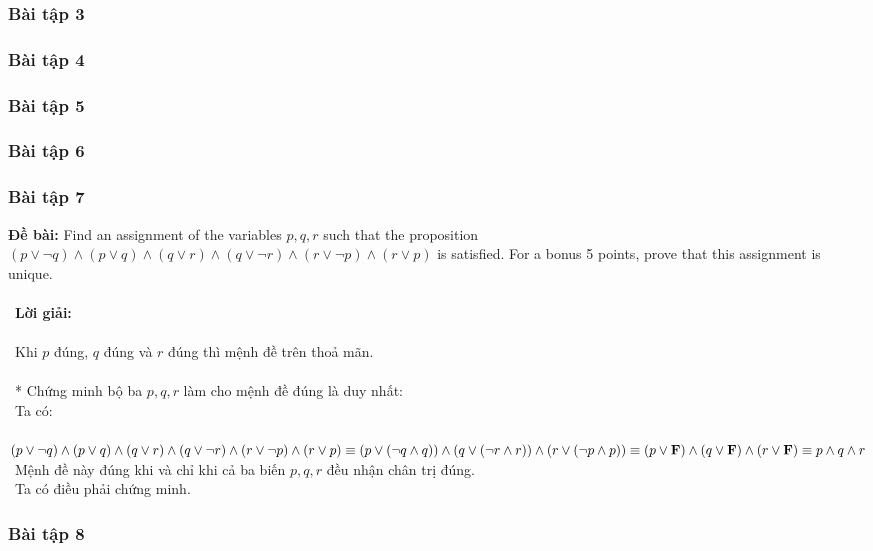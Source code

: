 \documentclass[a4paper]{article}
\begin{document}
\clearpage
\subsubsection{Bài tập 3}

\clearpage
\subsubsection{Bài tập 4}

\clearpage
\subsubsection{Bài tập 5}

\clearpage
\subsubsection{Bài tập 6}

\clearpage
\subsubsection{Bài tập 7}
\textbf{Đề bài: }Find an assignment of the variables $p, q, r$ such that the proposition $(p \lor \lnot q) \land (p \lor q) \land (q \lor r) \land (q \lor \lnot r) \land (r \lor \lnot p) \land (r \lor p)$ is satisfied. For a bonus 5 points, prove that this assignment is unique. \\\ \\\
\textbf{Lời giải:} \\\ \\\
Khi $p$ đúng, $q$ đúng và $r$ đúng thì mệnh đề trên thoả mãn. \\\ \\\
* Chứng minh bộ ba $p,q,r$ làm cho mệnh đề đúng là duy nhất: \\\
Ta có: \\\
$(p \lor \lnot q) \land (p \lor q) \land (q \lor r) \land (q \lor \lnot r) \land (r \lor \lnot p) \land (r \lor p) \\\equiv  (p \lor (\lnot q \land q)) \land (q \lor (\lnot r \land r)) \land (r \lor (\lnot p \land p))\\\equiv (p \lor \textbf{F}) \land (q \lor \textbf{F}) \land (r \lor \textbf{F}) \\\equiv p \land q \land r$ \\\
Mệnh đề này đúng khi và chỉ khi cả ba biến $p,q,r$ đều nhận chân trị đúng. \\\
Ta có điều phải chứng minh.
\clearpage
\subsubsection{Bài tập 8}
\end{document}
